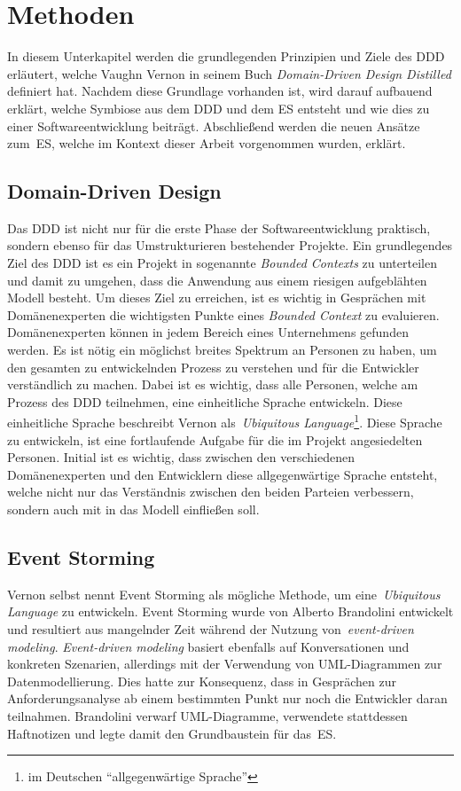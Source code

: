 \section{Methoden}\label{sec:event-storming}
In diesem Unterkapitel werden die grundlegenden Prinzipien und Ziele des \ac{DDD} erläutert, welche Vaughn Vernon in seinem Buch
\textit{Domain-Driven Design Distilled} definiert hat\cite*{dddd}.
Nachdem diese Grundlage vorhanden ist, wird darauf aufbauend erklärt, welche Symbiose aus dem \ac{DDD} und dem \ac{ES} entsteht und wie
dies zu einer Softwareentwicklung beiträgt.
Abschließend werden die neuen Ansätze zum~\ac{ES}, welche im Kontext dieser Arbeit vorgenommen wurden, erklärt.

\subsection{Domain-Driven Design}\label{subsec:domain-driven-design}
Das \ac*{DDD} ist nicht nur für die erste Phase der Softwareentwicklung praktisch, sondern ebenso für das Umstrukturieren bestehender Projekte.
Ein grundlegendes Ziel des \ac{DDD} ist es ein Projekt in sogenannte \textit{Bounded Contexts} zu unterteilen und damit zu umgehen, dass
die Anwendung aus einem riesigen aufgeblähten Modell besteht.
Um dieses Ziel zu erreichen, ist es wichtig in Gesprächen mit Domänenexperten die wichtigsten Punkte eines \textit{Bounded Context} zu evaluieren.
Domänenexperten können in jedem Bereich eines Unternehmens gefunden werden.
Es ist nötig ein möglichst breites Spektrum an Personen zu haben, um den gesamten zu entwickelnden Prozess zu verstehen und für die Entwickler verständlich zu machen.
Dabei ist es wichtig, dass alle Personen, welche am Prozess des \ac{DDD} teilnehmen, eine einheitliche Sprache entwickeln.
Diese einheitliche Sprache beschreibt Vernon als~\textit{Ubiquitous Language}\footnote{im Deutschen ``allgegenwärtige Sprache''}\cite*{dddd}.
Diese Sprache zu entwickeln, ist eine fortlaufende Aufgabe für die im Projekt angesiedelten Personen.
Initial ist es wichtig, dass zwischen den verschiedenen Domänenexperten und den Entwicklern diese allgegenwärtige Sprache entsteht, welche
nicht nur das Verständnis zwischen den beiden Parteien verbessern, sondern auch mit in das Modell einfließen soll.

\subsection{Event Storming}\label{subsec:allgemein}
Vernon selbst nennt Event Storming als mögliche Methode, um eine~\textit{Ubiquitous Language}\cite*{dddd} zu entwickeln.
Event Storming wurde von Alberto Brandolini entwickelt und resultiert aus mangelnder Zeit während der Nutzung von~\textit{event-driven modeling}.
\textit{Event-driven modeling} basiert ebenfalls auf Konversationen und konkreten Szenarien, allerdings mit der Verwendung von UML-Diagrammen zur Datenmodellierung.
Dies hatte zur Konsequenz, dass in Gesprächen zur Anforderungsanalyse ab einem bestimmten Punkt nur noch die Entwickler daran teilnahmen.
Brandolini verwarf UML-Diagramme, verwendete stattdessen Haftnotizen und legte damit den Grundbaustein für das~\ac{ES}\cite*{dddd}.

